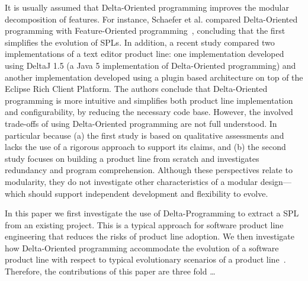 It is usually assumed that Delta-Oriented programming improves the modular decomposition 
of features. For instance, Schaefer et al. compared Delta-Oriented programming with Feature-Oriented
programming~\cite{batory-icse2003}, concluding that the first simplifies the evolution of
SPLs. In addition, a recent study compared two implementations of a
text editor product line: one implementation developed using DeltaJ 1.5 (a Java 5 implementation
of Delta-Oriented programming) and another implementation developed
using a plugin based architecture on top of the Eclipse Rich Client Platform. The authors
conclude that Delta-Oriented programming is more intuitive and simplifies both
product line implementation and configurability, by reducing the necessary code base.   
However, the involved trade-offs of using Delta-Oriented programming are not full understood.
In particular because (a) the first study is based on qualitative assessments and  lacks the use of a
rigorous approach to support its claims, and (b) the second study focuses on building a product line
from scratch and investigates redundancy and program comprehension.
Although these perspectives relate to modularity,  they do not investigate other
characteristics of a modular design--- which should support independent development
and flexibility to evolve. 

In this paper we first investigate the use of Delta-Programming to extract a
SPL from an existing project. This is a typical approach for
software product line engineering that reduces the risks of
product line adoption. We then investigate how Delta-Oriented
programming accommodate the evolution of a software
product line with respect to typical evolutionary scenarios
of a product line~\cite{neves-gpce2011}. Therefore, the contributions
of this paper are three fold {\ldots}

\vspace{-6pt}
